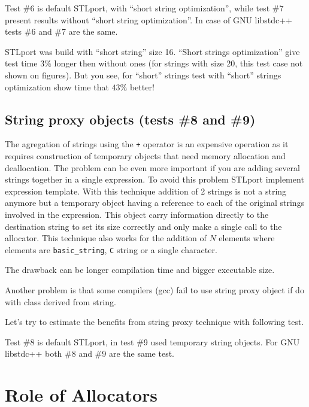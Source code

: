 \documentclass[a4paper]{article}
\providecommand{\STLport}{{\fontfamily{cmss}\selectfont STLport}}
\providecommand{\libstd}{{\fontfamily{cmtt}\selectfont GNU \mbox{libstdc++}}}
\begin{document}


Test \#6 is default \STLport{}, with ``short string optimization'', while
test \#7 present results without ``short string optimization''. In case of \libstd{}
tests \#6 and \#7 are the same.

\STLport{} was build with ``short string'' size 16. ``Short strings optimization'' give
test time $3\%$ longer then without ones (for strings with size 20, this test case
not shown on figures).
But you see, for ``short'' strings test with ``short'' strings optimization
show time that $43\%$ better!

\subsection{String proxy objects\label{add-string-proxy} (tests \#8 and \#9)}

The agregation of strings using the \verb|+| operator is an expensive operation
as it requires construction of temporary objects that need memory allocation
and deallocation. The problem can be even more important if you are adding
several strings together in a single expression. To avoid this problem \STLport{}
implement expression template. With this technique addition of 2 strings is not
a string anymore but a temporary object having a reference to each of the
original strings involved in the expression. This object carry information
directly to the destination string to set its size correctly and only make
a single call to the allocator. This technique also works for the addition of
$N$ elements where elements are \verb|basic_string|, \verb|C| string or a
single character.

The drawback can be longer compilation time and bigger executable size.

Another problem is that some compilers (gcc) fail to use string proxy object
if do with class derived from string.

Let's try to estimate the benefits from string proxy technique with following test.



Test \#8 is default \STLport{}, in test \#9 used temporary string objects.
For \libstd{} both \#8 and \#9 are the same test.


\section{Role of Allocators}
\end{document}
